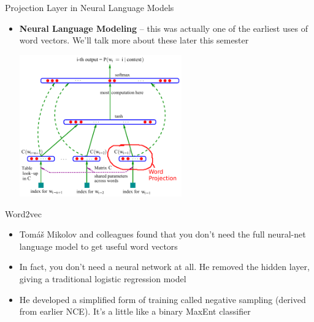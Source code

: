 \documentclass[xcolor=pdftex,x11names,table,hyperref]{beamer}
\begin{document}
\begin{frame}{Projection Layer in Neural Language Models}
\begin{itemize}
	\item \textbf{Neural Language Modeling} -- this was actually one of the earliest uses of word vectors.  We'll talk more about these later this semester \\
		\begin{center}
		\includegraphics[width=0.55\textwidth]{images/bengio-etal2003_pg6_image_alt.pdf} 
		\end{center}
\end{itemize}
\end{frame}


\begin{frame}{Word2vec}
\begin{itemize}
	\item Tom\'{a}\v{s} Mikolov and colleagues found that you don't need the full neural-net language model to get useful word vectors
	\pause
	\item In fact, you don't need a neural network at all. He removed the hidden layer, giving a traditional logistic regression model
	\pause
	\item He developed a simplified form of training called negative sampling (derived from earlier NCE).  It's a little like a binary MaxEnt  classifier
\end{itemize}
\end{frame}
\end{document}
